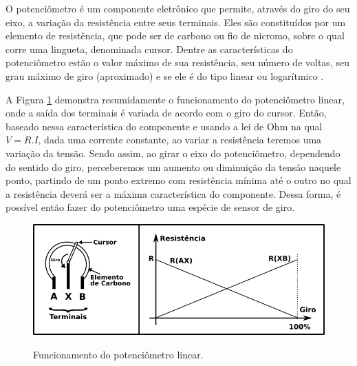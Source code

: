 \documentclass[
	12pt,				%
	openright,			%
	oneside,			%
	a4paper,			%
	english,			%
	brazil				%
	]{abntex2}
\begin{document}
		O potenciômetro é um componente eletrônico que permite, através do giro do seu eixo, a variação da resistência entre seus terminais. Eles são constituídos por um elemento de resistência, que pode ser de carbono ou fio de nicromo, sobre o qual corre uma lingueta, denominada cursor. Dentre as características do potenciômetro estão o valor máximo de sua resistência, seu número de voltas, seu grau máximo de giro (aproximado) e se ele é do tipo linear ou logarítmico \cite{ncb2012eletronicabasica}.

		A Figura \ref{Fig:potentiometer1} demonstra resumidamente o funcionamento do potenciômetro linear, onde a saída dos terminais é variada de acordo com o giro do cursor. Então, baseado nessa característica do componente e usando a lei de Ohm na qual $V = R.I$, dada uma corrente constante, ao variar a resistência teremos uma variação da tensão. Sendo assim, ao girar o eixo do potenciômetro, dependendo do sentido do giro, perceberemos um aumento ou diminuição da tensão naquele ponto, partindo de um ponto extremo com resistência mínima até o outro no qual a resistência deverá ser a máxima característica do componente. Dessa forma, é possível então fazer do potenciômetro uma espécie de sensor de giro.

		\begin{figure}[h!]
			\centering
  		\caption{Funcionamento do potenciômetro linear.}
  		\includegraphics[width=12cm]{./figures/potentiometer1.png}
  		\label{Fig:potentiometer1}
		\end{figure}







\end{document}
